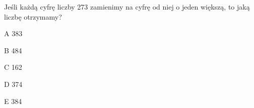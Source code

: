 \begin{tresc}
Jeśli każdą cyfrę liczby 273 zamienimy na cyfrę od niej o jeden większą, to jaką liczbę otrzymamy?
\end{tresc}
\begin{wariant}{A} 383 \end{wariant}
\begin{wariant}{B} 484 \end{wariant}
\begin{wariant}{C} 162 \end{wariant}
\begin{wariant}{D} 374 \end{wariant}
\begin{wariant}{E} 384 \end{wariant}
